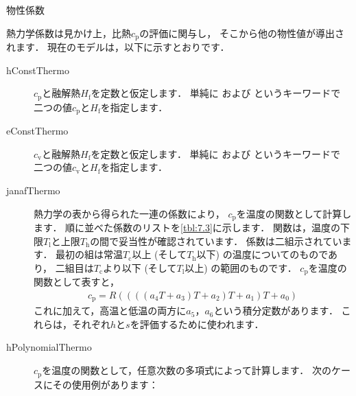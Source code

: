 \begin{table}[ht]
 
 \caption{物性係数}
 \label{tbl:7.2}
\end{table}


熱力学係数は見かけ上，比熱$c_{\mathrm{p}}$の評価に関与し，
そこから他の物性値が導出されます．
現在のモデルは，以下に示すとおりです．
\begin{description}
 \item[hConstThermo]
            $c_{\mathrm{p}}$と融解熱$H_{\mathrm{f}}$を定数と仮定します．
            単純に
%
%
            および
%
%
            というキーワードで
            二つの値$c_{\mathrm{p}}$と$H_{\mathrm{f}}$を指定します．
 \item[eConstThermo]
            $c_{\mathrm{v}}$と融解熱$H_{\mathrm{f}}$を定数と仮定します．
            単純に
%
%
            および
%
%
            というキーワードで
            二つの値$c_{\mathrm{v}}$と$H_{\mathrm{f}}$を指定します．
 \item[janafThermo]
            熱力学の表から得られた一連の係数により，
            $c_{\mathrm{p}}$を温度の関数として計算します．
            順に並べた係数のリストを\autoref{tbl:7.3}に示します．
            関数は，温度の下限$T_{\mathrm{l}}$と上限$T_{\mathrm{h}}$の間で妥当性が確認されています．
            係数は二組示されています．
            最初の組は常温$T_{\mathrm{c}}$以上 (そして$T_{\mathrm{h}}$以下) の温度についてのものであり，
            二組目は$T_{\mathrm{c}}$より以下 (そして$T_{\mathrm{l}}$以上) の範囲のものです．
            $c_{\mathrm{p}}$を温度の関数として表すと，
\begin{align}
 \label{eq:7.1}
 c_{\mathrm{p}} = R((((a_{4}T + a_{3})T + a_{2})T + a_{1})T + a_{0})
\end{align}
            これに加えて，高温と低温の両方に$a_{5}$，$a_{6}$という積分定数があります．
            これらは，それぞれ$h$と$s$を評価するために使われます．
 \item[hPolynomialThermo]
            $c_{\mathrm{p}}$を温度の関数として，任意次数の多項式によって計算します．
            次のケースにその使用例があります：\\
            \hfil{}
\end{description}



